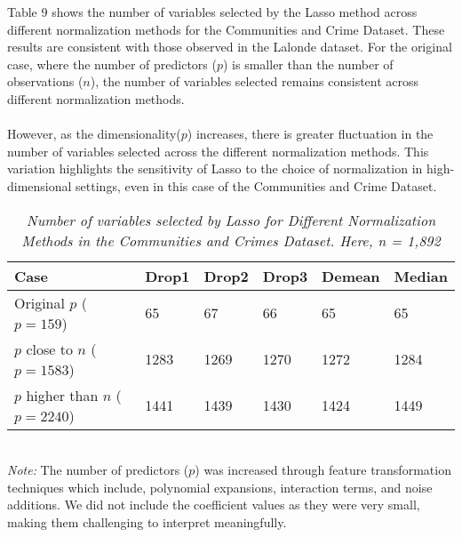 Table 9 shows the number of variables selected by the Lasso method across different normalization methods for the Communities and Crime Dataset. These results are consistent with those observed in the Lalonde dataset. For the original case, where the number of predictors ($p$) is smaller than the number of observations ($n$), the number of variables selected remains consistent across different normalization methods. \\
\\
However, as the dimensionality($p$) increases, there is greater fluctuation in the number of variables selected across the different normalization methods. This variation highlights the sensitivity of Lasso to the choice of normalization in high-dimensional settings, even in this case of the Communities and Crime Dataset. 
\begin{table}[h!]
\renewcommand{\arraystretch}{1.5}
\centering
\begin{tabular}{||l l l l l l||} 
 \hline
 \hline
 Case & Drop1 & Drop2 & Drop3 & Demean & Median \\ [0.5ex] 
 \hline\hline 
 Original $p$ ($p = 159$) & 65 & 67 & 66 & 65 & 65 \\ 
 $p$ close to $n$ ($p = 1583$) & 1283 & 1269 & 1270 & 1272 & 1284 \\
 $p$ higher than $n$ ($p= 2240$) & 1441 & 1439 & 1430 & 1424 & 1449 \\ [1ex] 
 \hline
\end{tabular}
\caption{\textit{Number of variables selected by Lasso for Different Normalization Methods in the Communities and Crimes Dataset. Here, n = 1,892 }}
\label{table:1}
\end{table}
\\
\textit{Note:} The number of predictors ($p$) was increased through feature transformation techniques which include, polynomial expansions, interaction terms, and noise additions. We did not include the coefficient values as they were very small, making them challenging to interpret meaningfully. \\
\\

